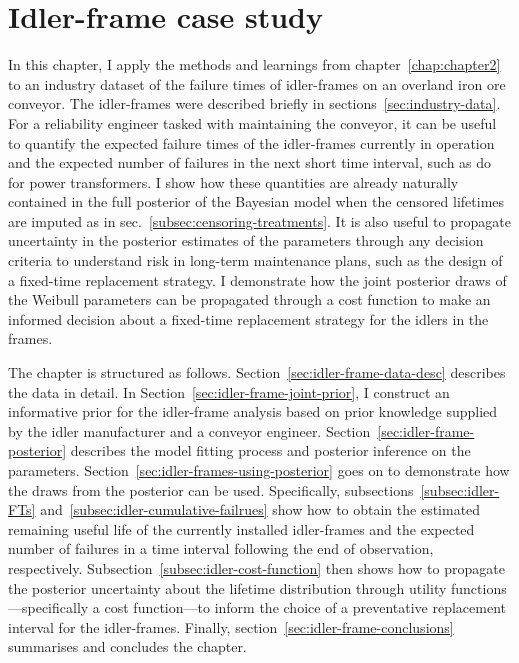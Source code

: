 \chapter{Idler-frame case study}\label{chap:chapter3}

In this chapter, I apply the methods and learnings from chapter~\ref{chap:chapter2} to an industry dataset of the failure times of idler-frames on an overland iron ore conveyor. The idler-frames were described briefly in sections~\ref{sec:industry-data}. For a reliability engineer tasked with maintaining the conveyor, it can be useful to quantify the expected failure times of the idler-frames currently in operation and the expected number of failures in the next short time interval, such as \citet{hong2009} do for power transformers. I show how these quantities are already naturally contained in the full posterior of the Bayesian model when the censored lifetimes are imputed as in sec.~\ref{subsec:censoring-treatments}. It is also useful to propagate uncertainty in the posterior estimates of the parameters through any decision criteria to understand risk in long-term maintenance plans, such as the design of a fixed-time replacement strategy. I demonstrate how the joint posterior draws of the Weibull parameters can be propagated through a cost function to make an informed decision about a fixed-time replacement strategy for the idlers in the frames.

The chapter is structured as follows. Section~\ref{sec:idler-frame-data-desc} describes the data in detail. In Section~\ref{sec:idler-frame-joint-prior}, I construct an informative prior for the idler-frame analysis based on prior knowledge supplied by the idler manufacturer and a conveyor engineer. Section~\ref{sec:idler-frame-posterior} describes the model fitting process and posterior inference on the parameters. Section~\ref{sec:idler-frames-using-posterior} goes on to demonstrate how the draws from the posterior can be used. Specifically, subsections~\ref{subsec:idler-FTs} and~\ref{subsec:idler-cumulative-failrues} show how to obtain the estimated remaining useful life of the currently installed idler-frames and the expected number of failures in a time interval following the end of observation, respectively. Subsection~\ref{subsec:idler-cost-function} then shows how to propagate the posterior uncertainty about the lifetime distribution through utility functions---specifically a cost function---to inform the choice of a preventative replacement interval for the idler-frames. Finally, section~\ref{sec:idler-frame-conclusions} summarises and concludes the chapter.

